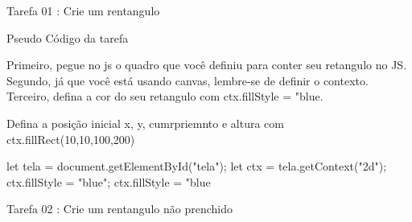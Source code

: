 Tarefa 01 : Crie um rentangulo

Pseudo Código da tarefa

Primeiro, pegue no js o quadro que você definiu para conter seu retangulo no JS.
Segundo, já que você está usando canvas, lembre-se de definir o contexto.
Terceiro, defina a cor do seu retangulo com ctx.fillStyle = "blue.

Defina a posição inicial x, y, cumrpriemnto e altura com ctx.fillRect(10,10,100,200)

                let tela = document.getElementById("tela");
                let ctx = tela.getContext("2d");
                ctx.fillStyle = "blue";
                ctx.fillStyle = "blue



Tarefa 02 : Crie um rentangulo não prenchido


